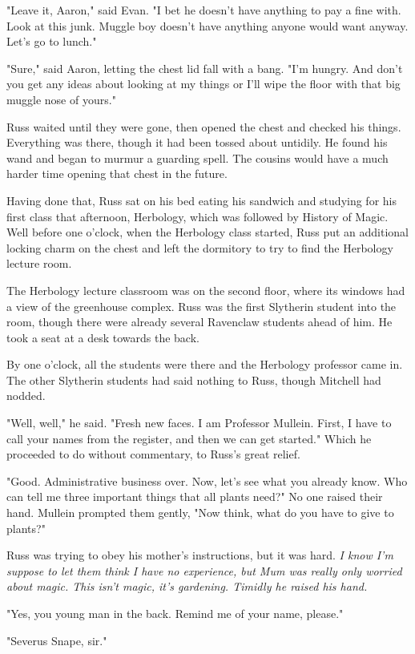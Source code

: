 "Leave it, Aaron," said Evan. "I bet he doesn't have anything to pay a fine with. Look at this junk. Muggle boy doesn't have anything anyone would want anyway. Let's go to lunch."

"Sure," said Aaron, letting the chest lid fall with a bang. "I'm hungry. And don't you get any ideas about looking at my things or I'll wipe the floor with that big muggle nose of yours."

Russ waited until they were gone, then opened the chest and checked his things. Everything was there, though it had been tossed about untidily. He found his wand and began to murmur a guarding spell. The cousins would have a much harder time opening that chest in the future.

Having done that, Russ sat on his bed eating his sandwich and studying for his first class that afternoon, Herbology, which was followed by History of Magic. Well before one o'clock, when the Herbology class started, Russ put an additional locking charm on the chest and left the dormitory to try to find the Herbology lecture room.

The Herbology lecture classroom was on the second floor, where its windows had a view of the greenhouse complex. Russ was the first Slytherin student into the room, though there were already several Ravenclaw students ahead of him. He took a seat at a desk towards the back.

By one o'clock, all the students were there and the Herbology professor came in. The other Slytherin students had said nothing to Russ, though Mitchell had nodded.

"Well, well," he said. "Fresh new faces. I am Professor Mullein. First, I have to call your names from the register, and then we can get started." Which he proceeded to do without commentary, to Russ's great relief.

"Good. Administrative business over. Now, let's see what you already know. Who can tell me three important things that all plants need?" No one raised their hand. Mullein prompted them gently, "Now think, what do you have to give to plants?"

Russ was trying to obey his mother's instructions, but it was hard. \emph{I know I'm suppose to let them think I have no experience, but Mum was really only worried about magic. This isn't magic, it's gardening. Timidly he raised his hand.}

"Yes, you young man in the back. Remind me of your name, please."

"Severus Snape, sir."

